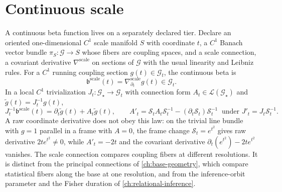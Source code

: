 \section{Continuous scale}

A continuous beta function lives on a separately declared tier. Declare an
oriented one-dimensional \(C^1\) scale manifold \(S\) with coordinate \(t\), a
\(C^1\) Banach vector bundle \(\pi_S:\mathscr G\to S\) whose fibers are coupling
spaces, and a scale connection, a covariant derivative
\(\nabla^{\mathrm{scale}}\) on sections of \(\mathscr G\) with the usual
linearity and Leibniz rules. For a \(C^1\) running coupling section
\(g(t)\in\mathscr G_t\), the continuous beta is
\begin{equation}
\mathfrak b^{\mathrm{scale}}(t)=\nabla^{\mathrm{scale}}_{\partial_t}g(t)
\in\mathscr G_t.
\label{eq:rg-covariant-scale-beta}
\end{equation}
In a local \(C^1\) trivialization \(J_t:\mathcal G_\star\to\mathscr G_t\) with
connection form \(A_t\in\mathcal L(\mathcal G_\star)\) and
\(\widetilde g(t)=J_t^{-1}g(t)\),
\begin{equation}
J_t^{-1}\mathfrak b^{\mathrm{scale}}(t)
=\partial_t\widetilde g(t)+A_t\widetilde g(t),
\qquad
A'_t=\mathcal S_tA_t\mathcal S_t^{-1}-(\partial_t\mathcal S_t)\mathcal S_t^{-1}
\ \text{ under }J'_t=J_t\mathcal S_t^{-1}.
\label{eq:rg-scale-connection-form}
\end{equation}
A raw coordinate derivative does not obey this law: on the trivial line bundle
with \(g=1\) parallel in a frame with \(A=0\), the frame change
\(\mathcal S_t=e^{t^2}\) gives raw derivative \(2te^{t^2}\neq0\), while
\(A'_t=-2t\) and the covariant derivative
\(\partial_t(e^{t^2})-2te^{t^2}\) vanishes. The scale connection compares
coupling fibers at different resolutions. It is distinct from the principal
connections of \cref{ch:base-geometry}, which compare statistical fibers along
the base at one resolution, and from the inference-orbit parameter and the
Fisher duration of \cref{ch:relational-inference}.

